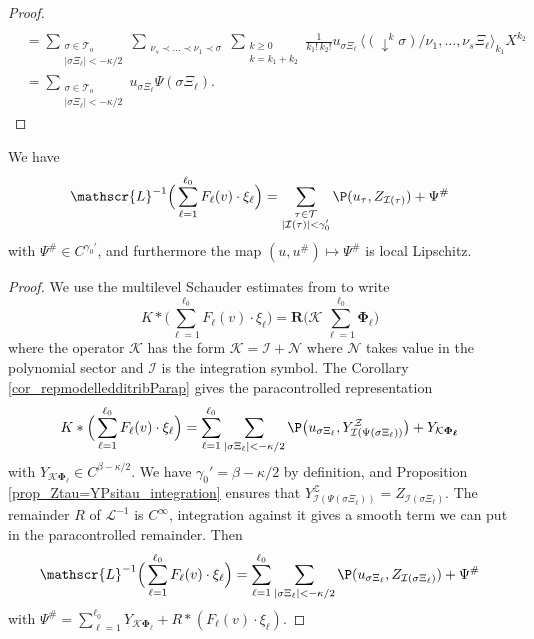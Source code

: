 \documentclass[11pt]{preprint}
\newcommand{\mcI}{\mathcal{I}}
\newcommand{\mcN}{\mathcal{N}}
\newcommand{\mcK}{\mathcal{K}}
\newcommand{\mcZ}{\mathcal{Z}}
\newcommand{\mcT}{\mathcal{T}}
\renewcommand{\lg}{\langle}
\newcommand{\rg}{\rangle}
\newcommand{\scrL}{\mathscr{L}}
\newcommand{\Linv}{\scrL^{-1}}
\begin{document}
\begin{proof}
\begin{align*}
			\\
			&=  \sum_{\substack{\sigma\in\mcT_o \\ |\sigma\Xi_\ell|< -\kappa/2 }} \sum_{\substack{ \nu_s\prec\dots\prec\nu_1\prec\sigma  }} \sum_{\substack{k\geq 0 \\ k=k_1+k_2 }} \frac{1}{k_1!\, k_2!} u_{\sigma\Xi_\ell} \, \lg (\downarrow^k\sigma)/\nu_1,\dots , \nu_s\Xi_\ell  \rg_{k_1}X^{k_2}
			\\
			&= \sum_{\substack{\sigma\in\mcT_o \\  |\sigma\Xi_\ell|< -\kappa/2     }}  u_{\sigma\Xi_\ell } \Psi( \sigma\Xi_\ell  ).
		\end{align*}	
	\end{proof}
	
	
	\begin{proposition}\label{prop_integration}
		We have 
		$$
		\scrL^{-1}\Big( \sum_{\ell=1}^{\ell_0} F_\ell(v) \cdot\xi_\ell  \Big) = \sum_{\substack{\tau\in\mcT \\  |\mcI(\tau)|<\gamma'_0 }} \P(u_\tau, Z_{\mcI(\tau)}  ) + \Psi^\#
		$$
		with $\Psi^\# \in C^{\gamma_0'}$, and furthermore the map $(u,u^\#) \mapsto \Psi^\#$ is local Lipschitz.
	\end{proposition}
	
	\begin{proof}
		We use the multilevel Schauder estimates from \cite[Theorem 5.12]{Hai14}  to write
		$$
		K*\Big( \sum_{\ell=1}^{\ell_0} F_\ell(v) \cdot\xi_\ell  \Big) = {\bm R} \Big( \mcK \,  \sum_{\ell=1}^{\ell_0}\boldsymbol{\Phi_\ell}\Big)
		$$
		where the operator $\mcK$ has the form $\mcK = \mcI + \mcN $ where $\mcN$ takes value in the polynomial sector and $\mcI$ is the integration symbol. 
		The Corollary \ref{cor_repmodelledditribParap} gives the paracontrolled representation
		$$
			K*\Big( \sum_{\ell=1}^{\ell_0} F_\ell(v) \cdot\xi_\ell  \Big) = \sum_{\ell=1}^{\ell_0}\sum_{|\sigma\Xi_\ell|<-\kappa/2} \P\big( u_{\sigma\Xi_\ell}, Y^\mcZ_{\mcI(\Psi(\sigma\Xi_\ell))}   \big) + Y_{\mcK \boldsymbol{\Phi_\ell}}
		$$
		with $Y_{\mcK \boldsymbol{\Phi_\ell}} \in C^{\beta-\kappa/2}$. We have $\gamma_0'=\beta-\kappa/2$ by definition, and Proposition \ref{prop_Ztau=YPsitau_integration} ensures that $Y^\mcZ_{\mcI(\Psi(\sigma\Xi_\ell))}=Z_{\mcI(\sigma\Xi_\ell)}$. The remainder $R$ of $\Linv$ is $C^\infty$, integration against it gives a smooth term we can put in the paracontrolled remainder. Then  
			$$
		\Linv\Big( \sum_{\ell=1}^{\ell_0} F_\ell(v) \cdot\xi_\ell  \Big) = \sum_{\ell=1}^{\ell_0}\sum_{|\sigma\Xi_\ell|<-\kappa/2} \P( u_{\sigma\Xi_\ell}, Z_{\mcI(\sigma\Xi_\ell)}   ) + \Psi^\#
		$$
		with $\Psi^\# = \sum_{\ell=1}^{\ell_0} Y_{\mcK \boldsymbol{\Phi_\ell}} + R *( F_\ell(v)\cdot\xi_\ell)$. 
	\end{proof}
	
\end{document}
